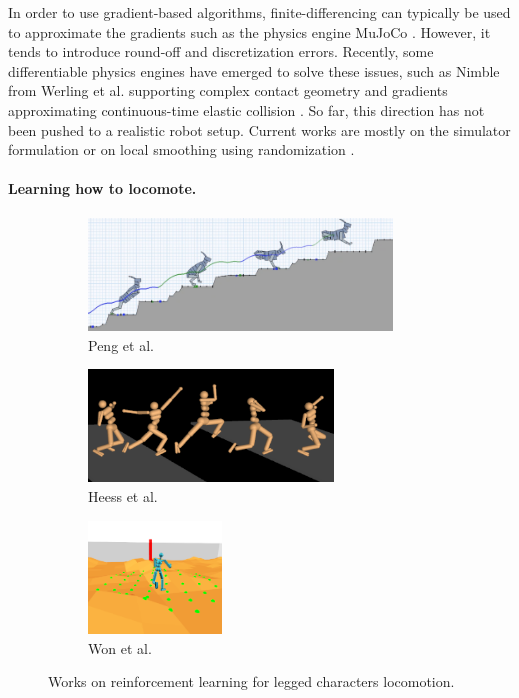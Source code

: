In order to use gradient-based algorithms, finite-differencing can typically be used to approximate the gradients such as the physics engine MuJoCo \cite{mujoco}. However, it tends to introduce round-off and discretization errors.
Recently, some differentiable physics engines have emerged to solve these issues, such as Nimble from Werling et al. supporting complex contact geometry and gradients approximating continuous-time elastic collision \cite{werling_2021}.
So far, this direction has not been pushed to a realistic robot setup. 
Current works are mostly on the simulator formulation \cite{chainqueen_2019, difftaichi_2019} or on local smoothing using randomization \cite{tedrake_2022_differentiable, carpentier_fix_differentiable_OC}.



\paragraph{Learning how to locomote.}
\begin{figure}[h]
    \centering
    \captionsetup[subfigure]{justification=centering}
    \begin{subfigure}[t]{0.36\linewidth}
    \includegraphics[width=\textwidth,height=3cm]{Figures/Chapter_SOTA//terrain_adaptive.png}
    \caption{Peng et al. \cite{terrain_adaptative_locomotion}}
    \label{fig:rl_agnostic_0}
    \end{subfigure}
    \begin{subfigure}[t]{0.36\linewidth}
    \includegraphics[width=\textwidth,height=3cm]{Figures/Chapter_SOTA//deepMindPPO.png}
    \caption{Heess et al. \cite{ppo_rich_locomotion} }
    \label{fig:rl_agnostic_1}
    \end{subfigure}
    \begin{subfigure}[t]{0.25\linewidth}
    \includegraphics[width=\textwidth,height=3cm]{Figures/Chapter_SOTA//vae2.png}
    \caption{Won et al. \cite{VAE_jungdam_2022}}
    \label{fig:rl_agnostic_2}
    \end{subfigure}
    \label{fig:rl_agnostic}
    \caption{Works on reinforcement learning for legged characters locomotion.}
\end{figure}

